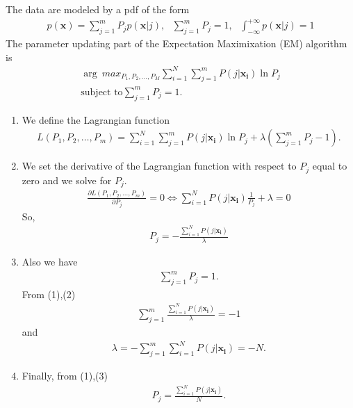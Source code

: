 \documentclass[12pt]{book}
\begin{document}
The data are modeled by a pdf of the form
\begin{align*}
p(\pmb{x}) = \sum_{j=1}^{m} P_j p(\pmb{x}|j), \ \ \  \sum_{j=1}^{m}P_j = 1, \ \ \ \int_{-\infty}^{+\infty}p(\pmb{x}|j)  = 1
\end{align*}
The parameter updating part of the Expectation Maximixation (EM) algorithm is
\begin{align*}
\arg \ max_{P_1,P_2,\dots,P_M} \sum_{i=1}^{N} \sum_{j=1}^{m}P(j|\pmb{x_i})\ln P_j \\
\text{subject to} \sum_{j=1}^{m}P_j = 1. \ \ \ \ \ \ \ \ \ \ \ \ \ \ \ \ \ \ \ \ \ \ 
\end{align*}
\begin{enumerate}[label=(\alph*)]
	\item We define the Lagrangian function
	\begin{align*}
	L(P_1,P_2,\dots,P_m) = \sum_{i=1}^{N} \sum_{j=1}^{m}P(j|\pmb{x_i})\ln P_j + \lambda(\sum_{j=1}^{m}P_j - 1).
	\end{align*}
	\item We set the derivative of the Lagrangian function with respect to $P_j$ equal to zero and we solve for $P_j$.
	\begin{align*}
	\frac{\partial L(P_1,P_2,\dots,P_m)}{\partial P_j} = 0 \iff \sum_{i=1}^{N} P(j|\pmb{x_i})\frac{1}{P_j} + \lambda = 0
	\end{align*}
	So,
	\begin{align}
	P_j = - \frac{\sum_{i=1}^{N} P(j|\pmb{x_i})}{\lambda}
	\end{align}
	\item Also we have
	\begin{align}
	\sum_{j=1}^{m}P_j = 1.
	\end{align}
	From (1),(2)
	\begin{align*}
	\sum_{j=1}^{m} \frac{\sum_{i=1}^{N} P(j|\pmb{x_i})}{\lambda} = -1
	\end{align*}
	and
	\begin{align}
	\lambda = - \sum_{j=1}^{m} \sum_{i=1}^{N} P(j|\pmb{x_i}) = -N.
	\end{align}
	\item 
	Finally, from (1),(3)
	\begin{align*}
	P_j = \frac{\sum_{i=1}^{N} P(j|\pmb{x_i})}{N}.
	\end{align*}
\end{enumerate}
\end{document}
